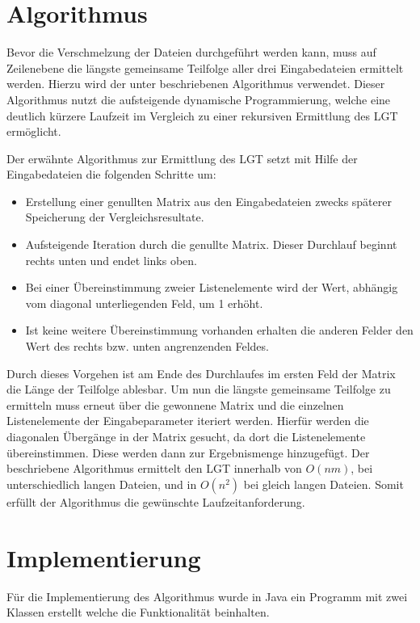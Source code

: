 \documentclass[a4paper,titlepage,12pt]{scrartcl}
\begin{document}
\section{Algorithmus}
\label{sec:algorithm}
Bevor die Verschmelzung der Dateien durchgeführt werden kann, muss auf Zeilenebene die längste gemeinsame Teilfolge aller drei Eingabedateien ermittelt werden.
Hierzu wird der unter \citet{www:EP96} beschriebenen Algorithmus verwendet. Dieser Algorithmus nutzt die aufsteigende dynamische Programmierung,
welche eine deutlich kürzere Laufzeit im Vergleich zu einer rekursiven Ermittlung des LGT ermöglicht.

Der erwähnte Algorithmus zur Ermittlung des LGT setzt mit Hilfe der Eingabedateien die folgenden Schritte um:

\begin{itemize}
\item Erstellung einer genullten Matrix aus den Eingabedateien zwecks späterer Speicherung der Vergleichsresultate.
\item Aufsteigende Iteration durch die genullte Matrix. Dieser Durchlauf beginnt rechts unten und endet links oben.
\item Bei einer Übereinstimmung zweier Listenelemente wird der Wert, abhängig vom diagonal unterliegenden Feld, um 1 erhöht.
\item Ist keine weitere Übereinstimmung vorhanden erhalten die anderen Felder den Wert des rechts bzw. unten angrenzenden Feldes.
\end{itemize}

Durch dieses Vorgehen ist am Ende des Durchlaufes im ersten Feld der Matrix die Länge der Teilfolge ablesbar.
Um nun die längste gemeinsame Teilfolge zu ermitteln muss erneut über die gewonnene Matrix und die einzelnen Listenelemente der Eingabeparameter iteriert werden.
Hierfür werden die diagonalen Übergänge in der Matrix gesucht, da dort die Listenelemente übereinstimmen. Diese werden dann zur Ergebnismenge hinzugefügt.
Der beschriebene Algorithmus ermittelt den LGT innerhalb von $O(nm)$, bei unterschiedlich langen Dateien, und in $O(n^2)$ bei gleich langen Dateien. Somit erfüllt der Algorithmus die gewünschte Laufzeitanforderung.


\section{Implementierung}
\label{sec:implementation}
Für die Implementierung des Algorithmus wurde in Java ein Programm mit zwei Klassen erstellt welche die Funktionalität beinhalten.
\end{document}
